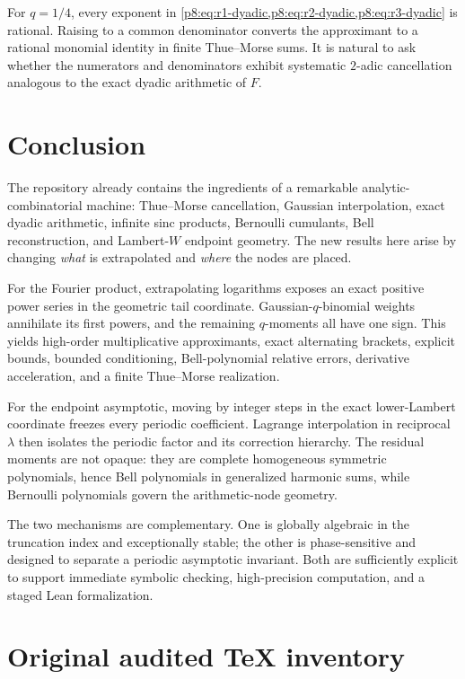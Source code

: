 \documentclass[11pt]{article}
\numberwithin{equation}{section}
\theoremstyle{definition}
\theoremstyle{remark}
\begin{document}
For $q=1/4$, every exponent in \cref{p8:eq:r1-dyadic,p8:eq:r2-dyadic,p8:eq:r3-dyadic} is rational. Raising to a common denominator converts the approximant to a rational monomial identity in finite Thue--Morse sums. It is natural to ask whether the numerators and denominators exhibit systematic $2$-adic cancellation analogous to the exact dyadic arithmetic of $F$.

\section{Conclusion}

The repository already contains the ingredients of a remarkable analytic-combinatorial machine: Thue--Morse cancellation, Gaussian interpolation, exact dyadic arithmetic, infinite sinc products, Bernoulli cumulants, Bell reconstruction, and Lambert-$W$ endpoint geometry. The new results here arise by changing \emph{what} is extrapolated and \emph{where} the nodes are placed.

For the Fourier product, extrapolating logarithms exposes an exact positive power series in the geometric tail coordinate. Gaussian-$q$-binomial weights annihilate its first powers, and the remaining $q$-moments all have one sign. This yields high-order multiplicative approximants, exact alternating brackets, explicit bounds, bounded conditioning, Bell-polynomial relative errors, derivative acceleration, and a finite Thue--Morse realization.

For the endpoint asymptotic, moving by integer steps in the exact lower-Lambert coordinate freezes every periodic coefficient. Lagrange interpolation in reciprocal $\lambda$ then isolates the periodic factor and its correction hierarchy. The residual moments are not opaque: they are complete homogeneous symmetric polynomials, hence Bell polynomials in generalized harmonic sums, while Bernoulli polynomials govern the arithmetic-node geometry.

The two mechanisms are complementary. One is globally algebraic in the truncation index and exceptionally stable; the other is phase-sensitive and designed to separate a periodic asymptotic invariant. Both are sufficiently explicit to support immediate symbolic checking, high-precision computation, and a staged Lean formalization.

\appendix
\renewcommand*{\theHsection}{\arabic{part}.\arabic{section}}

\section{Original audited TeX inventory}
\label{p8:app:inventory}
\end{document}
